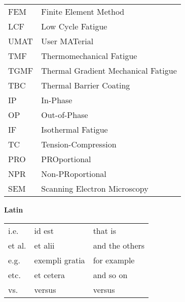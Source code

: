 \renewcommand\arraystretch{1.2}

\begin{table}[htbp]
  \centering
    \begin{tabular}{p{4cm}p{9.5cm}}
    FEM & Finite Element Method \\
    LCF & Low Cycle Fatigue \\
    UMAT & User MATerial \\
    TMF & Thermomechanical Fatigue \\
    TGMF & Thermal Gradient Mechanical Fatigue \\
    TBC & Thermal Barrier Coating \\
    IP & In-Phase \\
    OP & Out-of-Phase \\
    IF & Isothermal Fatigue \\
    TC & Tension-Compression \\
    PRO & PROportional \\
    NPR & Non-PRoportional \\
    SEM & Scanning Electron Microscopy \\
    \end{tabular}%
  \label{Tab:abbreviation}%
\end{table}%

\textbf{Latin}

\begin{table}[htbp]
  \centering
    \begin{tabular}{p{4cm}<{\raggedright}p{4cm}<{\raggedright}p{5cm}<{\raggedright}}
    i.e.      & id est             & that is \\
    et al.    & et alii            & and the others \\
    e.g.      & exempli gratia     & for example \\
    etc.      & et cetera          & and so on \\
    vs.       & versus             & versus \\
    \end{tabular}%
  \label{Tab:abbreviation_latin}%
\end{table}%
\renewcommand\arraystretch{1.0}